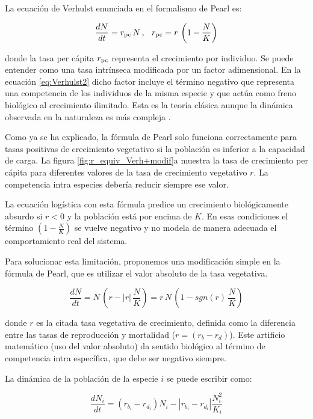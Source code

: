 La ecuación de Verhulst enunciada en el formalismo de Pearl es:

\begin{equation}
\frac{dN}{dt}=r_{\rm{pc}} \, N \, , \; \;\, r_{\rm{pc}}=r\, \left(1-\frac{N}{K}\right)
\label{eq:Verhulst2}
\end{equation}

\noindent  donde la tasa per cápita $r_{\rm{pc}}$ representa el crecimiento por individuo. Se puede entender como una tasa intrínseca 
modificada por un factor adimensional. En la ecuación \ref{eq:Verhulst2} dicho factor incluye el término negativo que representa una
competencia de los individuos de la misma especie y que actúa como freno biológico al crecimiento ilimitado. Esta
es la teoría clásica aunque la dinámica observada en la naturaleza es más compleja \cite{johnson2013}.

Como ya se ha explicado, la fórmula de Pearl solo funciona correctamente para tasas positivas de crecimiento vegetativo si la población
es inferior a la capacidad de carga. La figura \ref{fig:r_equiv_Verh+modif}a muestra la tasa de crecimiento per cápita para diferentes valores de la tasa de
crecimiento vegetativo $r$. La competencia intra especies debería reducir siempre ese valor.

La ecuación logística con esta fórmula predice un crecimiento biológicamente absurdo si $r<0$ y la población está por encima de $K$. En esas condiciones el término $\left(1-\frac{N}{K}\right)$ se vuelve negativo y no modela de manera adecuada el comportamiento real del sistema. 

Para solucionar esta limitación, proponemos una modificación simple en la fórmula de Pearl, que es utilizar el valor absoluto de la tasa vegetativa.

\begin{equation}
\frac{dN}{dt}= N \, \left(r - |r|\,    \frac{N}{K}\right)= r\,N \,\left(1-sgn(r)\,\frac{N}{K}\right)
\label{eq:Verh_r}
\end{equation}

\noindent donde $r$ es la citada tasa vegetativa de crecimiento, definida como la diferencia entre las tasas de reproducción y mortalidad ($r=\left(r_{b}-r_{d}\right)$). Este artificio matemático (uso del valor absoluto) da sentido biológico al término de competencia intra específica, que debe ser negativo siempre.

La dinámica de la población de la especie $i$ se puede escribir como:

\begin{equation}
\displaystyle \frac{dN_i}{dt}=\left(r_{b_i}-r_{d_i}\right) N_i - |r_{b_i}-r_{d_i}| \frac{N^2_i}{K_i}
\label{ec:vhoptionI}
\end{equation}

